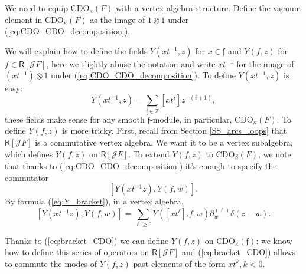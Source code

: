 \documentclass{amsart}
\theoremstyle{definition}
\newcommand{\R}{\Ring}
\newcommand{\Ring}{\mathsf{R}}
\newcommand{\Z}{\mathbb{Z}}
\newcommand{\Jet}{\mathscr{J}}
\newcommand{\ff}{\mathfrak{f}}
\newcommand{\CDO}{\mathrm{CDO}}
\numberwithin{equation}{section}
\begin{document}
We need to equip $\CDO_\kappa(F)$ with a vertex algebra structure. 
Define the vacuum element in  $\CDO_\kappa(F)$ as the image of $1\otimes 1$ under (\ref{eq:CDO_CDO_decomposition}). 


We will explain how to define the fields $Y(xt^{-1},z)$ for $x\in \mathfrak{f}$ and $Y(f,z)$ for $f \in \Ring[\Jet F]$, here we slightly abuse the notation and write $xt^{-1}$
for the image of $(xt^{-1})\otimes 1$ under (\ref{eq:CDO_CDO_decomposition}). To define $Y(xt^{-1},z)$ is easy: $$Y(xt^{-1},z)=\sum_{i\in \Z}[xt^i]z^{-(i+1)},$$ 
these fields make sense for any smooth $\hat{\mathfrak{f}}$-module, in particular, $\CDO_\kappa(F)$. To define $Y(f,z)$ is more tricky. First, recall from Section \ref{SS_arcs_loops} that $\Ring[\Jet F]$ is a commutative vertex algebra. We want it to be a vertex subalgebra, which defines $Y(f,z)$ on $\Ring[\Jet F]$. To extend $Y(f,z)$ to $\CDO_\beta(F)$, we note that thanks to (\ref{eq:CDO_CDO_decomposition}) it's enough to specify the commutator
\[
[Y(xt^{-1} z), Y(f,w)].
\]
By formula  (\ref{eq:Y_bracket}), in a vertex algebra, 
\begin{equation}\label{eq:bracket_CDO}
[Y(xt^{-1} z), Y(f,w)]=
\sum_{\ell \geqslant 0}  Y([xt^{\ell}].f,w) \partial_w^{(\ell)}\delta(z-w).
\end{equation}
 
Thanks to (\ref{eq:bracket_CDO}) we can define $Y(f,z)$ on $\CDO_\kappa(\ff)$: we know how to define this series of operators on $\R[\Jet F]$ and (\ref{eq:bracket_CDO}) allows to commute the modes of $Y(f,z)$ past elements of the form $xt^{k}, k<0$. 
\end{document}
